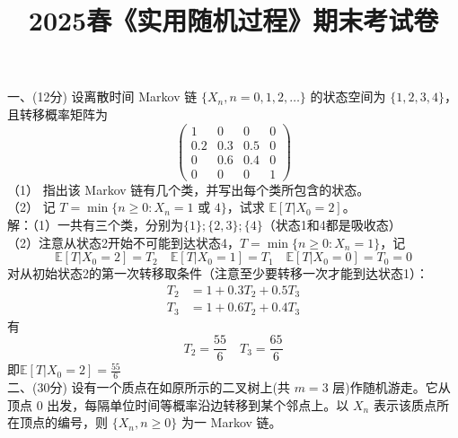 \documentclass[UTF8]{ctexart}
\title{2025春《实用随机过程》期末考试卷}
\author{}
\date{}
\begin{document}
\maketitle




\noindent 一、(12分) 设离散时间 Markov 链 $\{X_n, n = 0,1,2,\ldots\}$ 的状态空间为 $\{1,2,3,4\}$，且转移概率矩阵为
\[
\begin{pmatrix}
1 & 0 & 0 & 0 \\
0.2 & 0.3 & 0.5 & 0 \\
0 & 0.6 & 0.4 & 0 \\
0 & 0 & 0 & 1
\end{pmatrix}
\]
（1） 指出该 Markov 链有几个类，并写出每个类所包含的状态。\\
（2） 记 $T = \min\{n \geq 0 : X_n =  \text{1 或 4} \}$，试求 $\mathbb{E}[T|X_0 = 2]$。\\
解：（1）一共有三个类，分别为$\{1\};\{2,3\};\{4\}$（状态1和4都是吸收态）\\
（2）注意从状态2开始不可能到达状态4，$T = \min\{n \geq 0 : X_n = 1\}$，记
\[
\mathbb{E}[T|X_0 = 2]=T_2\quad
\mathbb{E}[T|X_0 = 1]=T_1\quad
\mathbb{E}[T|X_0 = 0]=T_0=0
\]
对从初始状态2的第一次转移取条件（注意至少要转移一次才能到达状态1）：
$$
\begin{aligned}
	T_2 &= 1+0.3T_2+0.5T_3 \\
	T_3 &= 1+0.6T_2+0.4T_3
\end{aligned}
$$
有
\[
T_2=\frac{55}{6} \quad T_3=\frac{65}{6}
\]
即$\mathbb{E}[T|X_0 = 2]=\frac{55}{6}$\\


\noindent 二、(30分) 设有一个质点在如原所示的二叉树上(共 $m = 3$ 层)作随机游走。它从顶点 0 出发，每隔单位时间等概率沿边转移到某个邻点上。以 $X_n$ 表示该质点所在顶点的编号，则 $\{X_n, n \geq 0\}$ 为一 Markov 链。
\begin{figure}[h!]
\centering
\end{figure}
\end{document}
